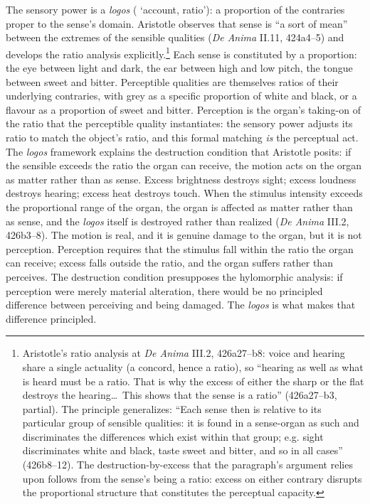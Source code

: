 The sensory power is a \textit{logos} ( `account, ratio'): a proportion of the contraries proper to the sense's domain. Aristotle observes that sense is ``a sort of mean'' between the extremes of the sensible qualities (\textit{De Anima} II.11, 424a4--5) and develops the ratio analysis explicitly.\footnote{Aristotle's ratio analysis at \textit{De Anima} III.2, 426a27--b8: voice and hearing share a single actuality (a concord, hence a ratio), so ``hearing as well as what is heard must be a ratio. That is why the excess of either the sharp or the flat destroys the hearing\ldots\ This shows that the sense is a ratio'' (426a27--b3, partial). The principle generalizes: ``Each sense then is relative to its particular group of sensible qualities: it is found in a sense-organ as such and discriminates the differences which exist within that group; e.g. sight discriminates white and black, taste sweet and bitter, and so in all cases'' (426b8--12). The destruction-by-excess that the paragraph's argument relies upon follows from the sense's being a ratio: excess on either contrary disrupts the proportional structure that constitutes the perceptual capacity.} Each sense is constituted by a proportion: the eye between light and dark, the ear between high and low pitch, the tongue between sweet and bitter. Perceptible qualities are themselves ratios of their underlying contraries, with grey as a specific proportion of white and black, or a flavour as a proportion of sweet and bitter. Perception is the organ's taking-on of the ratio that the perceptible quality instantiates: the sensory power adjusts its ratio to match the object's ratio, and this formal matching \textit{is} the perceptual act. The \textit{logos} framework explains the destruction condition that Aristotle posits: if the sensible exceeds the ratio the organ can receive, the motion acts on the organ as matter rather than as sense. Excess brightness destroys sight; excess loudness destroys hearing; excess heat destroys touch. When the stimulus intensity exceeds the proportional range of the organ, the organ is affected as matter rather than as sense, and the \textit{logos} itself is destroyed rather than realized (\textit{De Anima} III.2, 426b3--8). The motion is real, and it is genuine damage to the organ, but it is not perception. Perception requires that the stimulus fall within the ratio the organ can receive; excess falls outside the ratio, and the organ suffers rather than perceives. The destruction condition presupposes the hylomorphic analysis: if perception were merely material alteration, there would be no principled difference between perceiving and being damaged. The \textit{logos} is what makes that difference principled.

